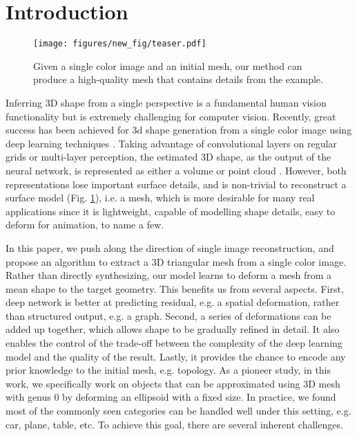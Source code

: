 \documentclass[runningheads]{llncs}
\newcommand{\figref}[1]{Fig. \ref{#1}}
\begin{document}
\section{Introduction}
\label{sec:intro}

\begin{figure}[t]
\centering
\texttt{[image: figures/new\_fig/teaser.pdf]}
\caption{Given a single color image and an initial mesh, our method can produce a high-quality mesh that contains details from the example.}
\label{fig:teaser}
\end{figure}






Inferring 3D shape from a single perspective is a fundamental human vision functionality but is extremely challenging for computer vision.
Recently, great success has been achieved for 3d shape generation from a single color image using deep learning techniques \cite{ChoyXGCS16,FanSG16}.
Taking advantage of convolutional layers on regular grids or multi-layer perception, the estimated 3D shape, as the output of the neural network, is represented as either a volume \cite{ChoyXGCS16} or point cloud \cite{FanSG16}. 
However, both representations lose important surface details, and is non-trivial to reconstruct a surface model (\figref{fig:teaser}), i.e. a mesh, which is more desirable for many real applications since it is lightweight, capable of modelling shape details, easy to deform for animation, to name a few. 




In this paper, we push along the direction of single image reconstruction, and propose an algorithm to extract a 3D triangular mesh from a single color image. Rather than directly synthesizing, our model learns to deform a mesh from a mean shape to the target geometry.
This benefits us from several aspects. First, deep network is better at predicting residual, e.g. a spatial deformation, rather than structured output, e.g. a graph. Second, a series of deformations can be added up together, which allows shape to be gradually refined in detail. It also enables the control of the trade-off between the complexity of the deep learning model and the quality of the result.
Lastly, it provides the chance to encode any prior knowledge to the initial mesh, e.g. topology. As a pioneer study, in this work, we specifically work on objects that can be approximated using 3D mesh with genus 0 by deforming an ellipsoid with a fixed size. In practice, we found most of the commonly seen categories can be handled well under this setting, e.g. car, plane, table, etc. To achieve this goal, there are several inherent challenges.
\end{document}
